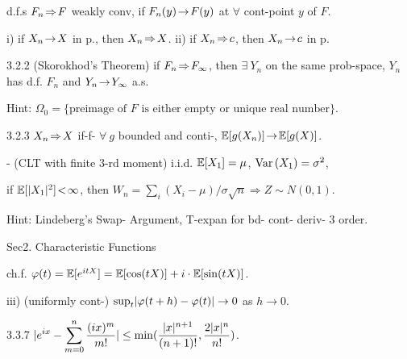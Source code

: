 
\begin{defi}
    d.f.s $F_n \!\Rightarrow\! F$ weakly conv, if $F_n(y) \!\rightarrow\! F(y)$ at $\forall$ cont-point $y$ of $F$.
\end{defi}

\begin{fact}
    i) if $X_n \!\rightarrow\! X$ in p., then $X_n \!\Rightarrow\! X$. ii) if $X_n \!\Rightarrow\! c$, then $X_n \!\rightarrow\! c$ in p.
\end{fact}

\begin{thm}{3.2.2} (Skorokhod's Theorem) if $F_n \!\Rightarrow\! F_\infty$, 
    \newline then $\exists\ Y_n$ on the same prob-space, $Y_n$ has d.f. $F_n$ and $Y_n \!\rightarrow\! Y_\infty$ a.s.
    
    Hint: $\Omega_0 = \{ \text{preimage of } F \text{ is either empty or unique real number} \}$.
\end{thm}

\begin{thm}{3.2.3}
    $X_n \!\Rightarrow\! X$ if-f- $\forall\ g$ bounded and conti-, $\mathbb{E}[g(X_n)] \!\rightarrow\! \mathbb{E}[g(X)]$.
\end{thm}

\begin{thm}{-} (CLT with finite 3-rd moment) 
    i.i.d. $\mathbb{E}[X_1] = \mu$, $\text{Var}\left( X_1 \right) = \sigma^2$, 
    
    if $\mathbb{E}[\lvert X_1 \rvert^2] \!<\! \infty$, then $W_n = \sum_i (X_i - \mu) / \sigma \sqrt{n} \Rightarrow Z \sim N(0, 1)$.
    
    Hint: Lindeberg's Swap- Argument, T-expan for bd- cont- deriv- 3 order. 
\end{thm}

Sec2. Characteristic Functions

\begin{defi}
    ch.f. $\varphi(t) = \mathbb{E}[e^{itX}] = \mathbb{E}[\cos(tX)] + i\cdot\mathbb{E}[\sin(tX)]$.
\end{defi}

\begin{prop}
    iii) (uniformly cont-) $\sup_t \lvert \varphi(t+h) - \varphi(t) \rvert \rightarrow 0$ as $h \rightarrow 0$.
\end{prop}

\begin{lem}{3.3.7}
    $\displaystyle \lvert e^{ix} - \sum_{m=0}^n \frac{(ix)^m}{m!} \rvert \leq 
    \min(\frac{\lvert x \rvert^{n+1}}{(n+1)!}, \frac{2\lvert x \rvert^n}{n!})$.
\end{lem}

